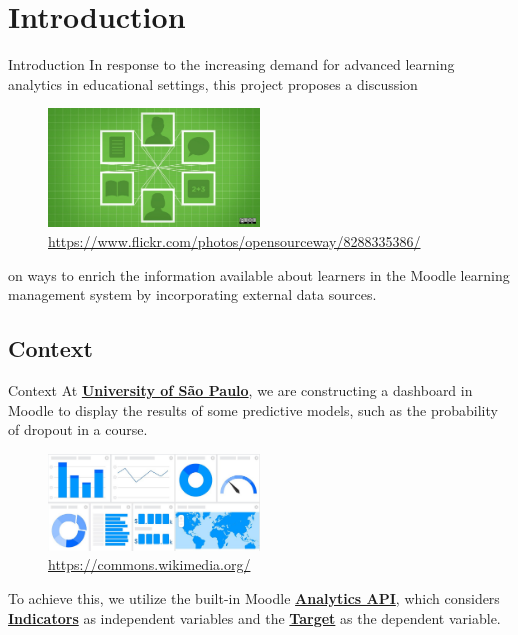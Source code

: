\section{Introduction}

\begin{frame}{Introduction}
    In response to the increasing demand for advanced learning analytics in educational settings, 
    this project proposes a discussion

    \begin{figure}[H]
        \centering
        \includegraphics[width=0.5\textwidth]{../../images/digital_learning.jpg}
        \\ \small \url{https://www.flickr.com/photos/opensourceway/8288335386/}
    \end{figure}

    on ways to enrich the information available about learners 
    in the Moodle learning management system by incorporating external data sources.
    \cite{lang2017handbook}
\end{frame}

\subsection{Context}
\begin{frame}{Context}
    At \underline{\textbf{University of São Paulo}}, we are constructing a dashboard in Moodle to 
    display the results of some predictive models, such as the probability of dropout in a course. 
   
    \begin{figure}[H]
        \centering
        \includegraphics[width=0.5\textwidth]{../../images/dashboard.jpg}
        \\ \small \url{https://commons.wikimedia.org/}

    \end{figure}

    To achieve this, we utilize the built-in Moodle \underline{\textbf{Analytics API}}, 
    which considers \underline{\textbf{Indicators}} as independent variables and the 
    \underline{\textbf{Target}} as the dependent variable.

\end{frame}

